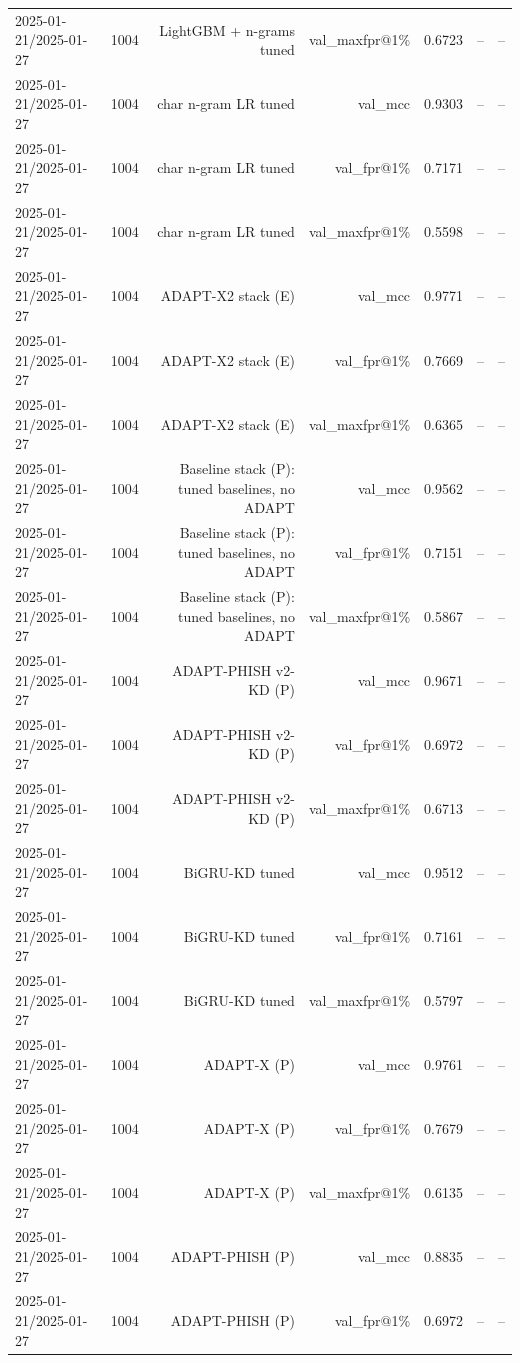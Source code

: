 \begin{table}[t]
\begin{tabular}{llrrrrr}
2025-01-21/2025-01-27 & 1004 & LightGBM + n-grams tuned & val\_maxfpr@1\% & 0.6723 & -- & -- \\
2025-01-21/2025-01-27 & 1004 & char n-gram LR tuned & val\_mcc & 0.9303 & -- & -- \\
2025-01-21/2025-01-27 & 1004 & char n-gram LR tuned & val\_fpr@1\% & 0.7171 & -- & -- \\
2025-01-21/2025-01-27 & 1004 & char n-gram LR tuned & val\_maxfpr@1\% & 0.5598 & -- & -- \\
2025-01-21/2025-01-27 & 1004 & ADAPT-X2 stack (E) & val\_mcc & 0.9771 & -- & -- \\
2025-01-21/2025-01-27 & 1004 & ADAPT-X2 stack (E) & val\_fpr@1\% & 0.7669 & -- & -- \\
2025-01-21/2025-01-27 & 1004 & ADAPT-X2 stack (E) & val\_maxfpr@1\% & 0.6365 & -- & -- \\
2025-01-21/2025-01-27 & 1004 & Baseline stack (P): tuned baselines, no ADAPT & val\_mcc & 0.9562 & -- & -- \\
2025-01-21/2025-01-27 & 1004 & Baseline stack (P): tuned baselines, no ADAPT & val\_fpr@1\% & 0.7151 & -- & -- \\
2025-01-21/2025-01-27 & 1004 & Baseline stack (P): tuned baselines, no ADAPT & val\_maxfpr@1\% & 0.5867 & -- & -- \\
2025-01-21/2025-01-27 & 1004 & ADAPT-PHISH v2-KD (P) & val\_mcc & 0.9671 & -- & -- \\
2025-01-21/2025-01-27 & 1004 & ADAPT-PHISH v2-KD (P) & val\_fpr@1\% & 0.6972 & -- & -- \\
2025-01-21/2025-01-27 & 1004 & ADAPT-PHISH v2-KD (P) & val\_maxfpr@1\% & 0.6713 & -- & -- \\
2025-01-21/2025-01-27 & 1004 & BiGRU-KD tuned & val\_mcc & 0.9512 & -- & -- \\
2025-01-21/2025-01-27 & 1004 & BiGRU-KD tuned & val\_fpr@1\% & 0.7161 & -- & -- \\
2025-01-21/2025-01-27 & 1004 & BiGRU-KD tuned & val\_maxfpr@1\% & 0.5797 & -- & -- \\
2025-01-21/2025-01-27 & 1004 & ADAPT-X (P) & val\_mcc & 0.9761 & -- & -- \\
2025-01-21/2025-01-27 & 1004 & ADAPT-X (P) & val\_fpr@1\% & 0.7679 & -- & -- \\
2025-01-21/2025-01-27 & 1004 & ADAPT-X (P) & val\_maxfpr@1\% & 0.6135 & -- & -- \\
2025-01-21/2025-01-27 & 1004 & ADAPT-PHISH (P) & val\_mcc & 0.8835 & -- & -- \\
2025-01-21/2025-01-27 & 1004 & ADAPT-PHISH (P) & val\_fpr@1\% & 0.6972 & -- & -- \\

\end{tabular}
\end{table}
